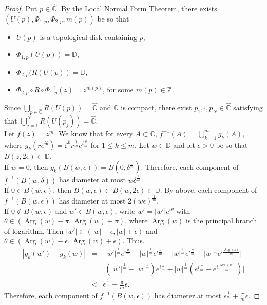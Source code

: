 \documentclass[10pt,a4paper]{amsart}
\def\Arg{\operatorname{Arg}}
\begin{document}
\begin{proof}
Put $p\in\widehat{\mathbb{C}}$. By the Local Normal Form Theorem, there exists $(U(p),\Phi_{1,p},\Phi_{2,p},m(p))$ be so that 
\begin{itemize}
\item $U(p)$ is a topological disk containing $p$,
\item $\Phi_{1,p}(U(p))=\mathbb{D}$,
\item $\Phi_{2,p}(R(U(p))=\mathbb{D}$,
\item $\Phi_{2,p}\circ R\circ \Phi_{1,p}^{-1}(z)=z^{m(p)}$, for some $m(p)\in\mathbb{Z}$.
\end{itemize}
Since $\bigcup_{p\in\widehat{\mathbb{C}}}R(U(p))=\widehat{\mathbb{C}}$ and $\widehat{\mathbb{C}}$ is compact, there exist $p_1,\cdot,p_N\in\widehat{\mathbb{C}}$ satisfying that $\bigcup_{j=1}^N R(U(p_j))=\widehat{\mathbb{C}}$.
\\

Let $f(z)=z^m$. We know that for every $A\subset\mathbb{C}$, $f^{-1}(A)=\bigcup_{k=1}^{m}g_k(A)$, where $g_k(re^{i\theta})=\zeta^kr^{\frac{1}{m}}e^{i\frac{\theta}{m}}$ for $1\leq k\leq m$. 
Let $w\in\mathbb{D}$ and let $\epsilon>0$ be so that $B(z,2\epsilon)\subset\mathbb{D}$. 
\\

If $w=0$, then $g_k(B(w,\epsilon))=B(0,\delta^{\frac{1}{m}})$. Therefore, each component of $f^{-1}(B(w,\delta))$ has diameter at most $w\delta^{\frac{1}{m}}$.
\\

If $0\in B(w,\epsilon)$, then $B(w,\epsilon)\subset B(w,2\epsilon)\subset\mathbb{D}$. By above, each component of $f^{-1}(B(w,\epsilon))$ has diameter at most $2(w\epsilon)^{\frac{1}{m}}$.
\\

If $0\notin B(w,\epsilon)$ and $w'\in B(w,\epsilon)$, write $w'=|w'|e^{i\theta}$ with $\theta\in (\Arg(w)-\pi,\Arg(w)+\pi)$, where $\Arg(w)$ is the principal branch of logarithm. Then $|w'|\in(|w|-\epsilon,|w|+\epsilon)$ and $\theta\in(\Arg(w)-\epsilon,\Arg(w)+\epsilon)$. Thus,
\begin{eqnarray*}
|g_k(w')-g_k(w)|&=&\big| |w'|^{\frac{1}{m}}e^{i\frac{\theta}{m}}-|w|^{\frac{1}{m}}e^{i\frac{\theta}{m}}+|w|^{\frac{1}{m}}e^{i\frac{\theta}{m}}-|w|^{\frac{1}{m}}e^{i\frac{\Arg(z)}{m}} \big|\\
&=&\big| (|w'|^{\frac{1}{m}}-|w|^{\frac{1}{m}})e^{i\frac{\theta}{m}}+|w|^{\frac{1}{m}}(e^{i\frac{\theta}{m}}-e^{i\frac{\Arg(w)}{m}}) \big|\\
&<&\epsilon^{\frac{1}{m}}+\frac{\pi}{m}\epsilon.
\end{eqnarray*}
Therefore, each component of $f^{-1}(B(w,\epsilon))$ has diameter at most $\epsilon^{\frac{1}{m}}+\frac{\pi}{m}\epsilon$.


\end{proof}
\end{document}
